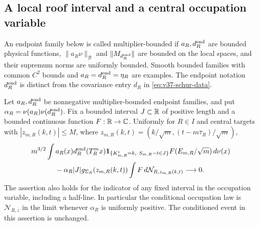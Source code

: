\subsection{A local roof interval and a central occupation variable}
An endpoint family below is called multiplier-bounded if $a_R,d_R^{\rm end}$
are bounded physical functions, $\|a_R\nu\|_{\mathcal B}$ and
$\|M_{d_R^{\rm end}}\|$ are bounded on the local spaces, and their
supremum norms are uniformly bounded. Smooth bounded families with
common $C^2$ bounds and $a_R=d_R^{\rm end}=\eta_R$ are examples.
The endpoint notation $d_R^{\rm end}$ is distinct from the covariance
entry $d_R$ in \eqref{eq:v37-schur-data}.

\begin{theorem}
\label{thm:v37-occupation-local-central}
Let $a_R,d_R^{\rm end}$ be nonnegative multiplier-bounded endpoint
families, and put $\alpha_R=\nu(a_R)\nu(d_R^{\rm end})$. Fix a bounded
interval $J\subset\mathbb R$ of positive length and a bounded continuous
function $F:\mathbb R\to\mathbb C$. Uniformly for $R\in I$ and central
targets with $|z_{m,R}(k,t)|\le M$, where
$z_{m,R}(k,t)=(k/\sqrt m,(t-m\bar\tau_R)/\sqrt m)$,
\begin{align}
 &m^{3/2}\int a_R(x)d_R^{\rm end}(T_R^mx)
  \one_{\{K^{\rm c}_{m,R}=k,\ S_{m,R}-t\in J\}}
                    F(E_{m,R}/\sqrt m)\,d\nu(x)\notag\\
 &\hspace{12mm}
 -\alpha_R|J|g_{\Sigma_R}(z_{m,R}(k,t))
                    \int F\,d\mathcal N_{R,z_{m,R}(k,t)}
                   \longrightarrow0.             \label{eq:v37-mixed-local-central}
\end{align}
The assertion also holds for the indicator of any fixed interval in
the occupation variable, including a half-line. In particular the
conditional occupation law is $\mathcal N_{R,z}$ in the limit whenever
$\alpha_R$ is uniformly positive. The conditioned event in this
assertion is unchanged.
\end{theorem}
